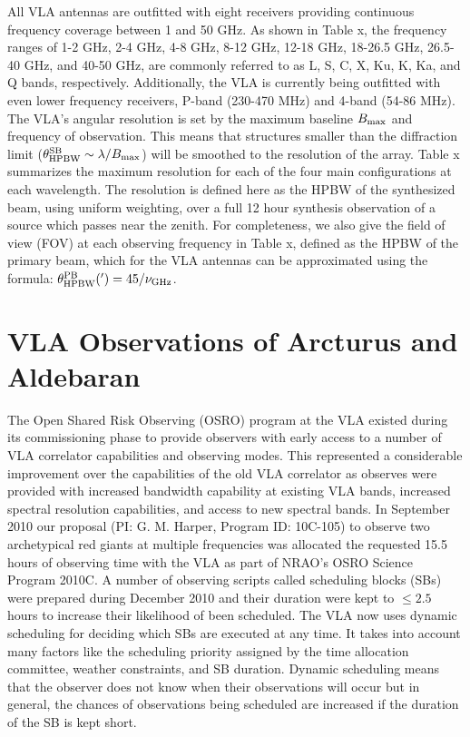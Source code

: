 All VLA antennas are outfitted with eight receivers providing continuous frequency coverage between 1 and 50 GHz. As shown in Table x, the frequency ranges of 1-2 GHz, 2-4 GHz, 4-8 GHz, 8-12 GHz, 12-18 GHz, 18-26.5 GHz, 26.5-40 GHz, and 40-50 GHz, are commonly referred to as L, S, C, X, Ku, K, Ka, and Q bands, respectively. Additionally, the VLA is currently being outfitted with even lower frequency receivers, P-band (230-470 MHz) and 4-band (54-86 MHz). The VLA's angular resolution is set by the maximum baseline $B_{\rm{max}}$ and frequency of observation. This means that structures smaller than the diffraction limit ($\theta_{\rm{HPBW}}^{\rm{SB}} \sim \lambda/B_{\rm{max}}$) will be smoothed to the resolution of the array. Table x summarizes the maximum resolution for each of the four main configurations at each wavelength. The resolution is defined here as the HPBW of the synthesized beam, using uniform weighting, over a full 12 hour synthesis observation of a source which passes near the zenith. For completeness, we also give the field of view (FOV) at each observing frequency in Table x, defined as the HPBW  of the primary beam, which for the VLA antennas can be approximated using the formula: $\theta_{\rm{HPBW}} ^{\rm{PB}} (')= 45/\nu _{\rm{GHz}}$. 

\section{VLA Observations of Arcturus and Aldebaran}\label{sec:3.6}

The Open Shared Risk Observing (OSRO) program at the VLA existed during its commissioning phase to provide observers with early access to a number of VLA correlator capabilities and observing modes. This represented a considerable improvement over the capabilities of the old VLA correlator as observes were provided with increased bandwidth capability at existing VLA bands, increased spectral resolution capabilities, and access to new spectral bands. In September 2010 our proposal (PI: G. M. Harper, Program ID: 10C-105) to observe two archetypical red giants at multiple frequencies was allocated the requested 15.5 hours of observing time with the VLA as part of NRAO's OSRO Science Program 2010C. A number of observing scripts called scheduling blocks (SBs) were prepared during December 2010 and their duration were kept to $\leq 2.5$ hours to increase their likelihood of been scheduled. The VLA now uses dynamic scheduling for deciding which SBs are executed at any time. It takes into account many factors like the scheduling priority assigned by the time allocation committee, weather constraints, and SB duration. Dynamic scheduling means that the observer does not know when their observations will occur but in general, the chances of observations being scheduled are increased if the duration of the SB is kept short.

